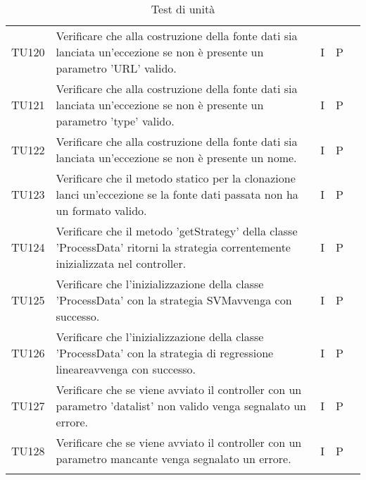 \begin{longtable} {
		>{}p{15mm} 
		>{}p{79.5mm}
		>{}p{15mm} 
		>{}p{15mm}
		>{}p{0mm}}
	TU120		& Verificare che alla costruzione della fonte dati sia lanciata un'eccezione se non è presente un parametro 'URL' valido.& I & P &\TBstrut \\ [2mm]
	TU121		& Verificare che alla costruzione della fonte dati sia lanciata un'eccezione se non è presente un parametro 'type' valido.& I & P &\TBstrut \\ [2mm]
	TU122		& Verificare che alla costruzione della fonte dati sia lanciata un'eccezione se non è presente un nome.& I & P &\TBstrut \\ [2mm]
	TU123		& Verificare che il metodo statico per la clonazione lanci un'eccezione se la fonte dati passata non ha un formato valido. & I & P &\TBstrut \\ [2mm]
	TU124		& Verificare che il metodo 'getStrategy' della classe 'ProcessData' ritorni la strategia correntemente inizializzata nel controller. & I & P &\TBstrut \\ [2mm]
	TU125		& Verificare che l'inizializzazione della classe 'ProcessData' con la strategia SVM\glosp avvenga con successo. & I & P &\TBstrut \\ [2mm]
	TU126		& Verificare che l'inizializzazione della classe 'ProcessData' con la strategia di regressione lineare\glosp avvenga con successo. & I & P &\TBstrut \\ [2mm]
	TU127		& Verificare che se viene avviato il controller con un parametro 'datalist' non valido venga segnalato un errore. & I & P &\TBstrut \\ [2mm]
	TU128		& Verificare che se viene avviato il controller con un parametro mancante venga segnalato un errore. & I & P &\TBstrut \\ [2mm]
	
	\rowcolor{white}
	\caption{Test di unità}
\end{longtable}
